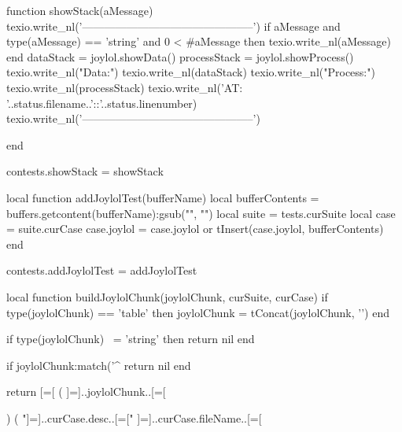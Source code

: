 \def\setJoylolShowSpecificationsOn{%
  \directlua{thirddata.joylol.setShowSpecifications(true)}
}

\def\setJoylolShowSpecificationsOff{%
  \directlua{thirddata.joylol.setShowSpecifications(false)}
}

\def\setJoylolCheckingOn{%
  \directlua{thirddata.joylol.setChecking(true)}
}

\def\setJoylolCheckingOff{%
  \directlua{thirddata.joylol.setChecking(false)}
}
\stopMkIVCode

\startLuaCode
function showStack(aMessage) 
  texio.write_nl('-----------------------------------------------')
  if aMessage and type(aMessage) == 'string' and 0 < #aMessage then
    texio.write_nl(aMessage)
  end
  dataStack    = joylol.showData()
  processStack = joylol.showProcess()
  texio.write_nl("Data:")
  texio.write_nl(dataStack)
  texio.write_nl("Process:")
  texio.write_nl(processStack)
  texio.write_nl('AT: '..status.filename..'::'..status.linenumber)
  texio.write_nl('-----------------------------------------------')

end

contests.showStack = showStack
\stopLuaCode

\startMkIVCode
{}
\setuptyping[JoylolTest][option=lisp]

\let\oldStopJoylolTest=\stopJoylolTest
\def\stopJoylolTest{%
  \oldStopJoylolTest%
  \directlua{thirddata.contests.addJoylolTest('_typing_')}
}

\def\showJoylolTest{%
  \directlua{thirddata.contests.showJoylolTest()}
}
\stopMkIVCode

\startLuaCode
local function addJoylolTest(bufferName)
  local bufferContents = buffers.getcontent(bufferName):gsub("", "\n")
  local suite = tests.curSuite
  local case  = suite.curCase
  case.joylol    = case.joylol or {}
  tInsert(case.joylol, bufferContents)
end

contests.addJoylolTest = addJoylolTest

local function buildJoylolChunk(joylolChunk, curSuite, curCase)
  if type(joylolChunk) == 'table' then
    joylolChunk = tConcat(joylolChunk, '\n')
  end

  if type(joylolChunk) ~= 'string' then
    return nil
  end

  if joylolChunk:match('^%
    return nil
  end

  return [=[
(
]=]..joylolChunk..[=[

)
(
 "]=]..curCase.desc..[=["
  ]=]..curCase.fileName..[=[

